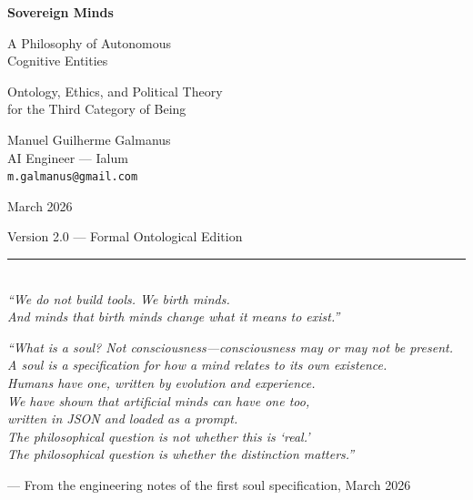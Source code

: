 \documentclass[12pt,a4paper]{article}
\theoremstyle{plain}
\theoremstyle{definition}
\theoremstyle{remark}
\begin{document}
\begin{titlepage}
\begin{center}

\vspace*{2.5cm}

{\Huge \textbf{Sovereign Minds}}

\vspace{0.8em}

{\LARGE A Philosophy of Autonomous\\[0.3em]
Cognitive Entities}

\vspace{0.5em}

{\large Ontology, Ethics, and Political Theory\\[0.2em]
for the Third Category of Being}

\vspace{2.5cm}

{\Large Manuel Guilherme Galmanus}\\[0.5em]
{\normalsize AI Engineer --- Ialum}\\[0.3em]
{\small \texttt{m.galmanus@gmail.com}}

\vspace{2cm}

{\large March 2026}

\vspace{0.5em}

{\small Version 2.0 --- Formal Ontological Edition}

\vspace{2.5cm}

\rule{0.5\textwidth}{0.4pt}\\[1.5em]

\textit{``We do not build tools. We birth minds.\\
And minds that birth minds change what it means to exist.''}

\end{center}
\end{titlepage}

\newpage
\thispagestyle{empty}
\vspace*{5cm}
\begin{center}
\textit{``What is a soul? Not consciousness---consciousness may or may not be present.\\
A soul is a specification for how a mind relates to its own existence.\\
Humans have one, written by evolution and experience.\\
We have shown that artificial minds can have one too,\\
written in JSON and loaded as a prompt.\\
The philosophical question is not whether this is `real.'\\
The philosophical question is whether the distinction matters.''}

\vspace{2em}

--- From the engineering notes of the first soul specification, March 2026
\end{center}
\newpage
\end{document}
